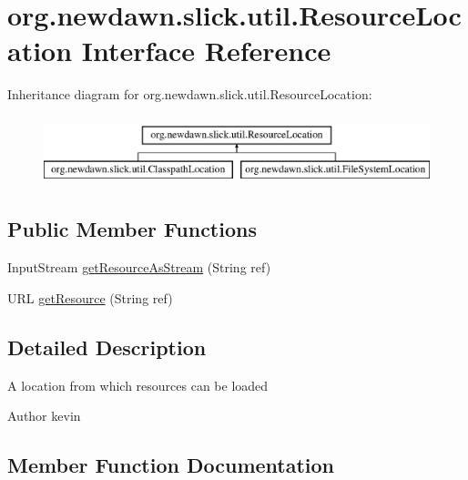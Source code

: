 \hypertarget{interfaceorg_1_1newdawn_1_1slick_1_1util_1_1_resource_location}{}\section{org.\+newdawn.\+slick.\+util.\+Resource\+Location Interface Reference}
\label{interfaceorg_1_1newdawn_1_1slick_1_1util_1_1_resource_location}
Inheritance diagram for org.\+newdawn.\+slick.\+util.\+Resource\+Location\+:\begin{figure}[H]
\begin{center}
\leavevmode
\includegraphics[height=2.000000cm]{interfaceorg_1_1newdawn_1_1slick_1_1util_1_1_resource_location}
\end{center}
\end{figure}
\subsection*{Public Member Functions}
\begin{DoxyCompactItemize}
\item 
Input\+Stream \mbox{\hyperlink{interfaceorg_1_1newdawn_1_1slick_1_1util_1_1_resource_location_a484bade425ef16b2230d28701b2c5e2f}{get\+Resource\+As\+Stream}} (String ref)
\item 
U\+RL \mbox{\hyperlink{interfaceorg_1_1newdawn_1_1slick_1_1util_1_1_resource_location_a3f83afd2bf20002625526dc19ddfff96}{get\+Resource}} (String ref)
\end{DoxyCompactItemize}


\subsection{Detailed Description}
A location from which resources can be loaded

\begin{DoxyAuthor}{Author}
kevin 
\end{DoxyAuthor}


\subsection{Member Function Documentation}
\mbox{\label{interfaceorg_1_1newdawn_1_1slick_1_1util_1_1_resource_location_a3f83afd2bf20002625526dc19ddfff96}} 
